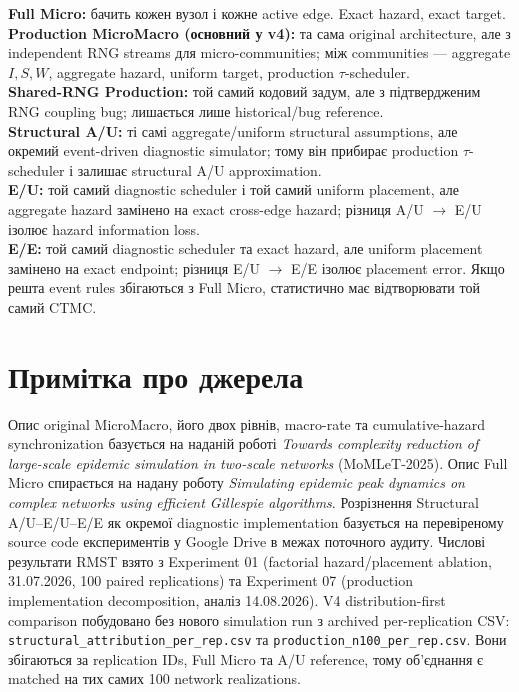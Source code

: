 \documentclass[11pt,a4paper]{article}
\begin{document}
\begin{tcolorbox}[colback=soft,colframe=dark]
\textbf{Full Micro:} бачить кожен вузол і кожне active edge. Exact hazard, exact target.\\[3pt]
\textbf{Production MicroMacro (основний у v4):} та сама original architecture, але з independent RNG streams для micro-communities; між communities --- aggregate $I,S,W$, aggregate hazard, uniform target, production $\tau$-scheduler.\\[3pt]
\textbf{Shared-RNG Production:} той самий кодовий задум, але з підтвердженим RNG coupling bug; лишається лише historical/bug reference.\\[3pt]
\textbf{Structural A/U:} ті самі aggregate/uniform structural assumptions, але окремий event-driven diagnostic simulator; тому він прибирає production $\tau$-scheduler і залишає structural A/U approximation.\\[3pt]
\textbf{E/U:} той самий diagnostic scheduler і той самий uniform placement, але aggregate hazard замінено на exact cross-edge hazard; різниця A/U $\to$ E/U ізолює hazard information loss.\\[3pt]
\textbf{E/E:} той самий diagnostic scheduler та exact hazard, але uniform placement замінено на exact endpoint; різниця E/U $\to$ E/E ізолює placement error. Якщо решта event rules збігаються з Full Micro, статистично має відтворювати той самий CTMC.
\end{tcolorbox}

\section*{Примітка про джерела}
Опис original MicroMacro, його двох рівнів, macro-rate та cumulative-hazard synchronization базується на наданій роботі \textit{Towards complexity reduction of large-scale epidemic simulation in two-scale networks} (MoMLeT-2025). Опис Full Micro спирається на надану роботу \textit{Simulating epidemic peak dynamics on complex networks using efficient Gillespie algorithms}. Розрізнення Structural A/U--E/U--E/E як окремої diagnostic implementation базується на перевіреному source code експериментів у Google Drive в межах поточного аудиту. Числові результати RMST взято з Experiment 01 (factorial hazard/placement ablation, 31.07.2026, 100 paired replications) та Experiment 07 (production implementation decomposition, аналіз 14.08.2026). V4 distribution-first comparison побудовано без нового simulation run з archived per-replication CSV: \texttt{structural\_attribution\_per\_rep.csv} та \texttt{production\_n100\_per\_rep.csv}. Вони збігаються за replication IDs, Full Micro та A/U reference, тому об'єднання є matched на тих самих 100 network realizations.
\end{document}
